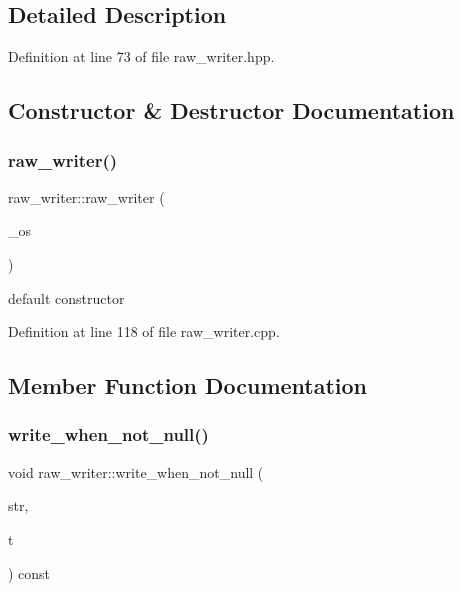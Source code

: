 \subsection{Detailed Description}


Definition at line 73 of file raw\+\_\+writer.\+hpp.



\subsection{Constructor \& Destructor Documentation}
\mbox{\label{structraw__writer_a2b1040098c68a5cbcfa9a931e945d01d}} 
\subsubsection{\texorpdfstring{raw\+\_\+writer()}{raw\_writer()}}
{\footnotesize\ttfamily raw\+\_\+writer\+::raw\+\_\+writer (\begin{DoxyParamCaption}\item[{std\+::ostream \&}]{\+\_\+os }\end{DoxyParamCaption})\hspace{0.3cm}{\ttfamily [explicit]}}



default constructor 



Definition at line 118 of file raw\+\_\+writer.\+cpp.



\subsection{Member Function Documentation}
\mbox{\label{structraw__writer_ace83fca22bfc78a66753b8645278a6b0}} 
\subsubsection{\texorpdfstring{write\+\_\+when\+\_\+not\+\_\+null()}{write\_when\_not\_null()}}
{\footnotesize\ttfamily void raw\+\_\+writer\+::write\+\_\+when\+\_\+not\+\_\+null (\begin{DoxyParamCaption}\item[{const std\+::string \&}]{str,  }\item[{const \hyperlink{tree__node_8hpp_a6ee377554d1c4871ad66a337eaa67fd5}{tree\+\_\+node\+Ref} \&}]{t }\end{DoxyParamCaption}) const}



